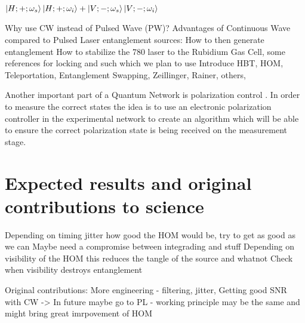 \documentclass{article}
\theoremstyle{mytheoremstyle}
\theoremstyle{mytheoremstyle}
\theoremstyle{myproblemstyle}
\begin{document}
$\ket{H;+;\omega_s}\ket{H;+;\omega_i}+\ket{V;-;\omega_s}\ket{V;-;\omega_i}$

Why use CW instead of Pulsed Wave (PW)?
Advantages of Continuous Wave compared to Pulsed Laser entanglement sources:
How to then generate entanglement
How to stabilize the 780 laser to the Rubidium Gas Cell, some references for locking and such which we plan to use
Introduce HBT, HOM, Teleportation, Entanglement Swapping, Zeillinger, Rainer, others,

Another important part of a Quantum Network is polarization control \cite{CCSHDCDRS}. In order to measure the correct states the 
idea is to use an electronic polarization controller in the experimental network to create an algorithm which will be able to 
ensure the correct polarization state is being received on the measurement stage.

\newpage
\section{Expected results and original contributions to science}
Depending on timing jitter how good the HOM would be, try to get as good as we can
Maybe need a compromise between integrading and stuff
Depending on visibility of the HOM this reduces the tangle of the source and whatnot
Check when visibility destroys entanglement

Original contributions: More engineering - filtering, jitter, 
Getting good SNR with CW -> In future maybe go to PL - working principle may be the same and might bring great imrpovement of HOM
\end{document}
